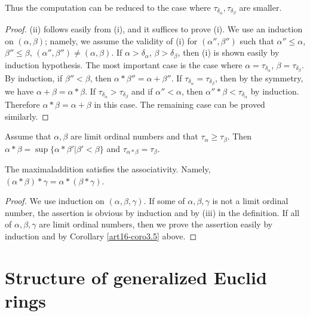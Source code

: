 Thus the computation can be reduced to the case where $\tau_{\delta_\alpha}, \tau_{\delta_\beta}$ are smaller.

\begin{proof}
(ii) follows easily from (i), and it suffices to prove (i). We use an induction on $(\alpha, \beta)$; namely, we assume the validity of (i) for $(\alpha'', \beta'')$ such that $\alpha'' \leqslant \alpha$, $\beta'' \leqslant \beta$, $(\alpha'' ,\beta'') \neq (\alpha, \beta)$. If $\alpha > \delta_\alpha$, $\beta> \delta_\beta$, then (i) is shown easily by induction hypothesis. The most important case is the case where $\alpha = \tau_{\delta_\alpha}$, $\beta = \tau_{\delta_\beta}$. By induction, if $\beta'' < \beta$, then $\alpha * \beta'' = \alpha + \beta''$. If $\tau_{\delta_\alpha} = \tau_{\delta_\beta}$, then by the symmetry, we have $\alpha + \beta = \alpha * \beta$. If $\tau_{\delta_\alpha } > \tau_{\delta_\beta}$ and if $\alpha'' < \alpha$, then $\alpha'' * \beta < \tau_{\delta_\alpha}$ by induction. Therefore $\alpha * \beta = \alpha + \beta$ in this case. The remaining case can be proved similarly. 
\end{proof}

\begin{corollary}\label{art16-coro3.5}
Assume that $\alpha, \beta$ are limit ordinal numbers and that $\tau_\alpha \geqslant \tau_\beta$. Then $\alpha * \beta = \sup \{\alpha * \beta' | \beta' < \beta\}$ and $\tau_{\alpha * \beta} = \tau_\beta$.
\end{corollary}

\begin{thm}\label{art16-thm3.6}
The maximal\pageoriginale addition satisfies the associativity. Namely, $(\alpha * \beta) * \gamma = \alpha * (\beta * \gamma)$.
\end{thm}

\begin{proof}
We use induction on $(\alpha, \beta, \gamma)$. If some of $\alpha, \beta, \gamma$ is not a limit ordinal number, the assertion is obvious by induction and by (iii) in the definition. If all of $\alpha, \beta,\gamma$ are limit ordinal numbers, then we prove the assertion easily by induction and by Corollary \ref{art16-coro3.5} above. 
\end{proof}

\section{Structure of generalized Euclid rings}\label{art16-sec4}

